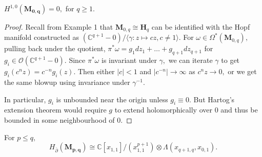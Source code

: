 \begin{lemma}
    $H^{1,0}(\mathbf{M_{0,q}}) = 0,$ for $q \ge 1.$
\end{lemma}

\begin{proof}
    Recall from Example 1 that $\mathbf{M}_{0,q}\cong \mathbf{H}_{q}$ can be identified with the Hopf manifold constructed as $(\mathbb{C}^{q+1} - 0)/\langle \gamma: z\mapsto cz, c \neq 1 \rangle.$ For $\omega \in \Omega^*(\mathbf{M}_{0,q}),$ pulling back under the quotient, $\pi^*\omega = g_1 dz_1 + \dots + g_{q+1}dz_{q+1}$ for $g_i \in \mathcal{O}(\mathbb{C}^{q+1} - 0).$ Since $\pi^*\omega$ is invariant under $\gamma,$ we can iterate $\gamma$ to get $g_i(c^nz) = c^{-n}g_i(z).$ Then either $|c|<1$ and $|c^{-n}|\to \infty$ as $c^nz \to 0,$ or we get the same blowup using invariance under $\gamma^{-1}.$
    
    In particular, $g_i$ is unbounded near the origin unless $g_i \equiv 0.$ But Hartog's extension theorem would require $g$ to extend holomorphically over $0$ and thus be bounded in some neighbourhood of $0.$
\end{proof}

\begin{theorem}
    For $p \le q,$
    \[
    H_{\overline\partial}(\mathbf{M_{p,q}}) \cong \mathbb{C}[x_{1,1}]/(x^{p+1}_{1,1}) \otimes \Lambda(x_{q+1,q},x_{0,1}).
    \]
\end{theorem}

